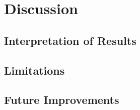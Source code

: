 \chapter{Discussion}

\section{Interpretation of Results}

\section{Limitations}

\section{Future Improvements}
